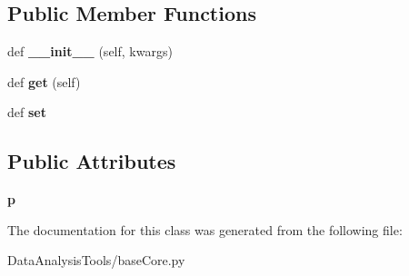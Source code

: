 \subsection*{Public Member Functions}
\begin{DoxyCompactItemize}
\item 
\mbox{\label{classMIS_1_1DataAnalysisTools_1_1baseCore_1_1filePath_ae69bbf2eb87e0f53eda359b8bc281f80}} 
def {\bfseries \+\_\+\+\_\+init\+\_\+\+\_\+} (self, kwargs)
\item 
\mbox{\label{classMIS_1_1DataAnalysisTools_1_1baseCore_1_1filePath_ad461d1140ff9ed21c899668f9c81e62d}} 
def {\bfseries get} (self)
\item 
\mbox{\label{classMIS_1_1DataAnalysisTools_1_1baseCore_1_1filePath_afb18248fb3cd52df785dc003645decdb}} 
def {\bfseries set}
\end{DoxyCompactItemize}
\subsection*{Public Attributes}
\begin{DoxyCompactItemize}
\item 
\mbox{\label{classMIS_1_1DataAnalysisTools_1_1baseCore_1_1filePath_a972ccef364e06198dbde6947d9147627}} 
{\bfseries p}
\end{DoxyCompactItemize}


The documentation for this class was generated from the following file\+:\begin{DoxyCompactItemize}
\item 
Data\+Analysis\+Tools/base\+Core.\+py\end{DoxyCompactItemize}
